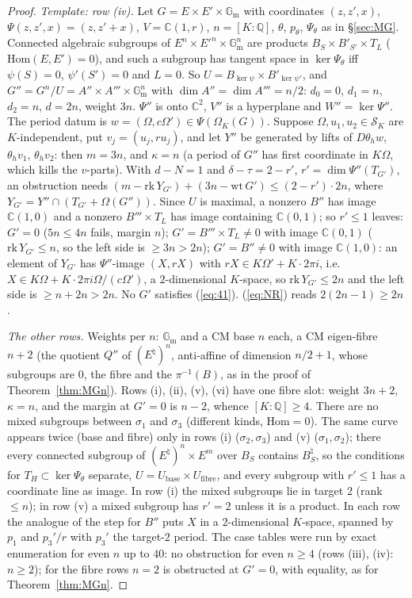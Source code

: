 \documentclass[11pt]{amsart}
\theoremstyle{definition}
\newcommand{\C}{\mathbb{C}}
\newcommand{\Q}{\mathbb{Q}}
\newcommand{\Gm}{\mathbb{G}_{\mathrm m}}
\begin{document}
\begin{proof}
\emph{Template: row (iv).} Let $G=E\times E'\times\Gm$ with coordinates $(z,z',x)$, $\Psi(z,z',x)=(z,z'+x)$, $V=\C(1,r)$,
$n=[K:\Q]$, $\theta$, $p_\theta$, $\Psi_\theta$ as in \S\ref{sec:MG}. Connected algebraic subgroups of $E^n\times E'^n\times\Gm^n$
are products $B_S\times B'_{S'}\times T_L$ ($\mathrm{Hom}(E,E')=0$), and such a subgroup has tangent space in $\ker\Psi_\theta$
iff $\psi(S)=0$, $\psi'(S')=0$ and $L=0$. So $U=B_{\ker\psi}\times B'_{\ker\psi'}$, and $G''=G^n/U=A''\times A'''\times\Gm^n$
with $\dim A''=\dim A'''=n/2$: $d_0=0$, $d_1=n$, $d_2=n$, $d=2n$, weight $3n$. $\Psi''$ is onto $\C^2$, $V''$ is a hyperplane
and $W''=\ker\Psi''$. The period datum is $w=(\Omega,c\Omega')\in\Psi(\Omega_K(G))$. Suppose $\Omega,u_1,u_2\in\mathcal S_K$ are
$K$-independent, put $v_j=(u_j,ru_j)$, and let $Y''$ be generated by lifts of $D\theta_hw$, $\theta_hv_1$, $\theta_hv_2$: then
$m=3n$, and $\kappa=n$ (a period of $G''$ has first coordinate in $K\Omega$, which kills the $v$-parts). With $d-N=1$ and
$\delta-\tau=2-r'$, $r'=\dim\Psi''(T_{G'})$, an obstruction needs
$(m-\mathrm{rk}\,Y_{G'})+(3n-\mathrm{wt}\,G')\le(2-r')\cdot2n$, where $Y_{G'}=Y''\cap(T_{G'}+\Omega(G''))$. Since $U$ is
maximal, a nonzero $B''$ has image $\C(1,0)$ and a nonzero $B'''\times T_L$ has image containing $\C(0,1)$; so $r'\le1$ leaves:
$G'=0$ ($5n\le4n$ fails, margin $n$); $G'=B'''\times T_L\ne0$ with image $\C(0,1)$ ($\mathrm{rk}\,Y_{G'}\le n$, so the left
side is $\ge3n>2n$); $G'=B''\ne0$ with image $\C(1,0)$: an element of $Y_{G'}$ has $\Psi''$-image $(X,rX)$ with
$rX\in K\Omega'+K\cdot2\pi i$, i.e.\ $X\in K\Omega+K\cdot2\pi i\Omega/(c\Omega')$, a $2$-dimensional $K$-space, so
$\mathrm{rk}\,Y_{G'}\le2n$ and the left side is $\ge n+2n>2n$. No $G'$ satisfies (\ref{eq:41}). (\ref{eq:NR}) reads
$2(2n-1)\ge2n$.

\emph{The other rows.} Weights per $n$: $\Gm$ and a CM base $n$ each, a CM eigen-fibre $n+2$ (the quotient $Q''$ of
$(E^\natural)^n$, anti-affine of dimension $n/2+1$, whose subgroups are $0$, the fibre and the $\pi^{-1}(B)$, as in the proof of
Theorem~\ref{thm:MGn}). Rows (i), (ii), (v), (vi) have one fibre slot: weight $3n+2$, $\kappa=n$, and the margin at $G'=0$ is
$n-2$, whence $[K:\Q]\ge4$. There are no mixed subgroups between $\sigma_1$ and $\sigma_3$ (different kinds, $\mathrm{Hom}=0$).
The same curve appears twice (base and fibre) only in rows (i) ($\sigma_2,\sigma_3$) and (v) ($\sigma_1,\sigma_2$); there every
connected subgroup of $(E^\natural)^n\times E^m$ over $B_S$ contains $B_S^\natural$, so the conditions for $T_H\subset\ker\Psi_\theta$
separate, $U=U_{\mathrm{base}}\times U_{\mathrm{fibre}}$, and every subgroup with $r'\le1$ has a coordinate line as image. In row
(i) the mixed subgroups lie in target $2$ (rank $\le n$); in row (v) a mixed subgroup has $r'=2$ unless it is a product. In each
row the analogue of the step for $B''$ puts $X$ in a $2$-dimensional $K$-space, spanned by $p_1$ and $p_3'/r$ with $p_3'$ the
target-$2$ period. The case tables were run by exact enumeration for even $n$ up to $40$: no obstruction for even $n\ge4$ (rows
(iii), (iv): $n\ge2$); for the fibre rows $n=2$ is obstructed at $G'=0$, with equality, as for Theorem~\ref{thm:MGn}.


\end{proof}
\end{document}
